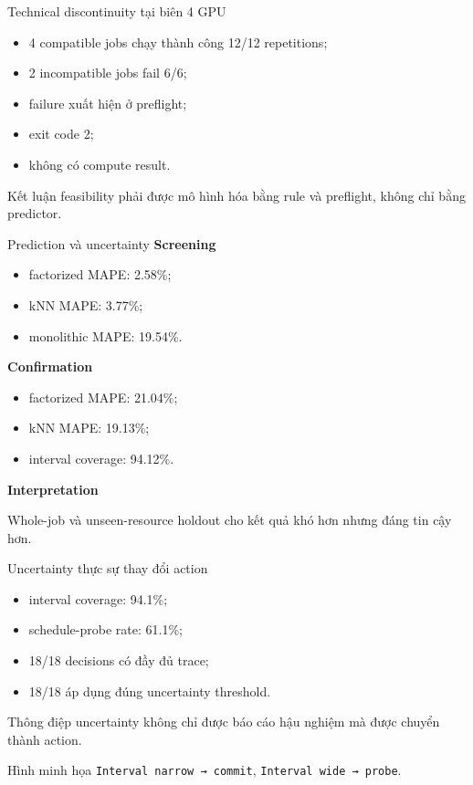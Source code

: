 \begin{frame}[t,shrink=20]{Technical discontinuity tại biên 4 GPU}
\scriptsize
\begin{itemize}
\item 4 compatible jobs chạy thành công 12/12 repetitions;
\item 2 incompatible jobs fail 6/6;
\item failure xuất hiện ở preflight;
\item exit code 2;
\item không có compute result.
\end{itemize}
\begin{alertblock}{Kết luận}
feasibility phải được mô hình hóa bằng rule và preflight, không chỉ bằng predictor.
\end{alertblock}
\end{frame}

\begin{frame}[t,shrink=20]{Prediction và uncertainty}
\scriptsize
\vspace{0.15em}
\textbf{Screening}\par
\begin{itemize}
\item factorized MAPE: 2.58\%;
\item kNN MAPE: 3.77\%;
\item monolithic MAPE: 19.54\%.
\end{itemize}
\vspace{0.15em}
\textbf{Confirmation}\par
\begin{itemize}
\item factorized MAPE: 21.04\%;
\item kNN MAPE: 19.13\%;
\item interval coverage: 94.12\%.
\end{itemize}
\vspace{0.15em}
\textbf{Interpretation}\par
Whole-job và unseen-resource holdout cho kết quả khó hơn nhưng đáng tin cậy hơn.\par
\end{frame}

\begin{frame}[t,shrink=20]{Uncertainty thực sự thay đổi action}
\scriptsize
\begin{itemize}
\item interval coverage: 94.1\%;
\item schedule-probe rate: 61.1\%;
\item 18/18 decisions có đầy đủ trace;
\item 18/18 áp dụng đúng uncertainty threshold.
\end{itemize}
\begin{alertblock}{Thông điệp}
uncertainty không chỉ được báo cáo hậu nghiệm mà được chuyển thành action.
\end{alertblock}
\begin{exampleblock}{Hình minh họa}
\texttt{Interval narrow → commit}, \texttt{Interval wide → probe}.
\end{exampleblock}
\end{frame}

